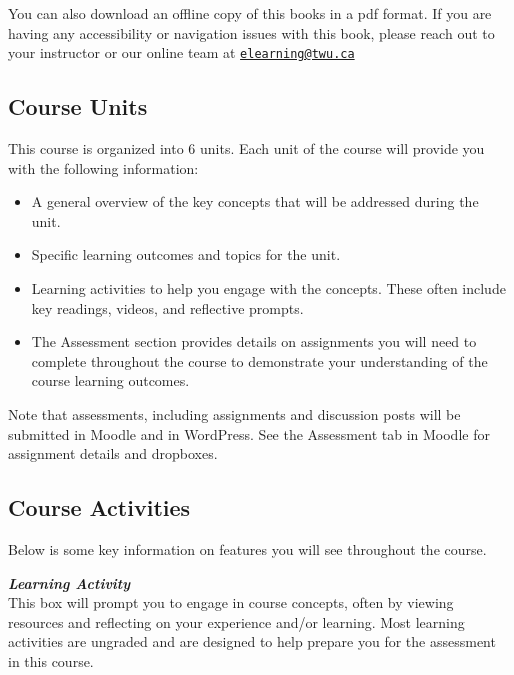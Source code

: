 \documentclass[
]{book}
\providecommand{\tightlist}{%
  \setlength{\itemsep}{0pt}\setlength{\parskip}{0pt}}
\theoremstyle{definition}
\theoremstyle{definition}
\theoremstyle{definition}
\theoremstyle{definition}
\theoremstyle{remark}
\begin{document}
You can also download an offline copy of this books in a pdf format. If you are having any accessibility or navigation issues with this book, please reach out to your instructor or our online team at \href{mailto:elearning@twu.ca}{\nolinkurl{elearning@twu.ca}}

\hypertarget{course-units}{%
\subsection*{Course Units}\label{course-units}}

This course is organized into 6 units. Each unit of the course will provide you with the following information:

\begin{itemize}
\tightlist
\item
  A general overview of the key concepts that will be addressed during the unit.
\item
  Specific learning outcomes and topics for the unit.
\item
  Learning activities to help you engage with the concepts. These often include key readings, videos, and reflective prompts.
\item
  The Assessment section provides details on assignments you will need to complete throughout the course to demonstrate your understanding of the course learning outcomes.
\end{itemize}

\begin{caution}
 Note that assessments, including assignments and discussion posts will
 be submitted in Moodle and in WordPress. See the Assessment tab in
 Moodle for assignment details and dropboxes.
 \end{caution}

\hypertarget{course-activities}{%
\subsection*{Course Activities}\label{course-activities}}

Below is some key information on features you will see throughout the course.

\begin{reflect}
\textbf{\emph{Learning Activity}}\\
This box will prompt you to engage in course concepts, often by viewing
resources and reflecting on your experience and/or learning. Most
learning activities are ungraded and are designed to help prepare you
for the assessment in this course.
\end{reflect}
\end{document}

